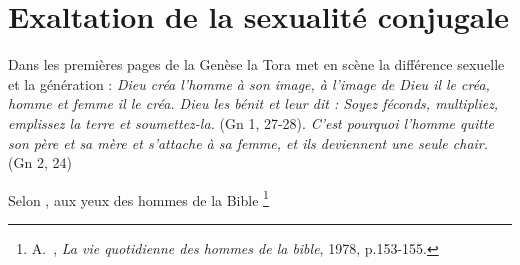 \section{Exaltation de la sexualité conjugale}

 Dans les premières pages de la Genèse la Tora met en scène la différence sexuelle et la génération : \emph{Dieu créa l'homme à son image, à l'image de Dieu il le créa, homme et femme il le créa. Dieu les bénit et leur dit : Soyez féconds, multipliez, emplissez la terre et soumettez-la.} (Gn 1, 27-28). \emph{C'est pourquoi l'homme quitte son père et sa mère et s'attache à sa femme, et ils deviennent une seule chair.} (Gn 2, 24)

 Selon , aux yeux des hommes de la Bible%
\footnote{A.~, \emph{La vie quotidienne des hommes de la bible}, 1978, p.153-155.}%
